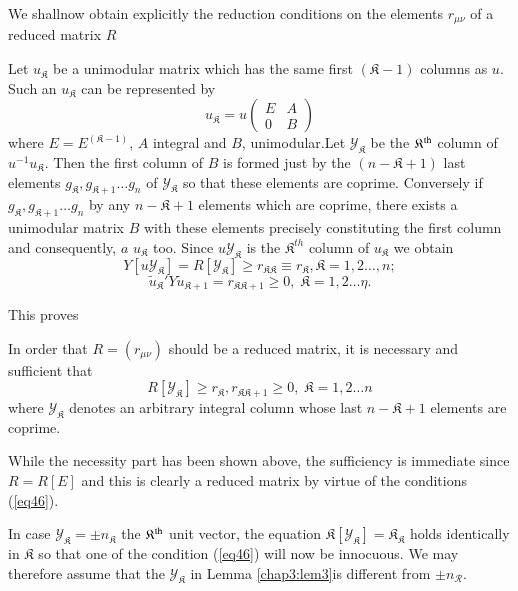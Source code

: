  We shall\pageoriginale now obtain explicitly the reduction conditions
 on the  elements $r_{\mu \nu}$ of a reduced matrix $R$  
 
 Let $u_{\mathfrak{K}}$ be a unimodular matrix which has the same first
 $(\mathfrak{K}-1)$ columns as $u$. Such an $u_{\mathfrak{K}}$ can be
 represented by   
 $$
  u_{\mathfrak{K}} = u \begin{pmatrix}  E & A \\ 0 & B\end{pmatrix} 
 $$ 
 where $E =E^{({\mathfrak{K}} - 1)}$, $A$ integral and $B$, unimodular.Let
 $\mathscr{Y}_{\mathfrak{K}}$ be the $\mathfrak{K}^{\rm th}$ column of
 $u^{-1} u _{\mathfrak{K}}$. Then the first column of $B$ is formed
 just by the  $(n - \mathfrak{K} +1)$ last elements $g_\mathfrak{K}
 ,g_{\mathfrak{K}+1} \ldots g_n $ of $\mathscr{Y}_{\mathfrak{K}}$ so
 that these elements are coprime. Conversely if $g_{\mathfrak{K}}
 ,g_{\mathfrak{K}+1} \ldots g_n $ by any $ n- {\mathfrak{K} +1}$
 elements which are coprime, there exists a unimodular matrix $B$ with
 these elements precisely constituting the first column and
 consequently, $a$  $u_{\mathfrak{K}}$ too. Since $u
 \mathscr{Y}_\mathfrak{K}$ is the ${\mathfrak{K}^{th}}$ column of
 $u_{\mathfrak{K}}$ we obtain 
 $$
 Y [u \mathscr{Y}_{\mathfrak{K}}] = R [\mathscr{Y}_{\mathfrak{K}}]
 \ge r_{\mathfrak{K} \mathfrak{K}} \equiv r_{\mathfrak{K}},
 \mathfrak{K} = 1,2\ldots ,n; 
 $$
 $$
 \tilde{u}_{\mathfrak{K}}' Y \tilde{u}_{\mathfrak{K}+1} =
 r_{\mathfrak{K}\mathfrak{K} +1} \ge 0,\; \mathfrak{K} = 1,2 \dots
 \eta . 
 $$
 
 This proves

\setcounter{lem}{2}
 \begin{lem} \label{chap3:lem3} %
In order that $R = (r_{\mu \nu})$ should be a reduced matrix, it
  is necessary and sufficient that  
\begin{equation*}
R [\mathscr{Y}_\mathfrak{K}] \ge r_\mathfrak{K}, r_{\mathfrak{K}
  \mathfrak{K}+1} \ge 0, \; \mathfrak{K} = 1,2 \dots n  \tag{46}\label{eq46} 
\end{equation*}
where $\mathscr{Y}_{\mathfrak{K}}$ denotes an arbitrary integral
  column whose last $n - \mathfrak{K}+1$ elements are coprime. 
 \end{lem} 
 
 While the necessity part has been shown above, the sufficiency is
 immediate since $R = R[E]$ and this is clearly a reduced matrix by
 virtue of the conditions (\ref{eq46}).  
 
 In case $\mathscr{Y}_{\mathfrak{K}} = \pm n_{\mathfrak{K}}$ the
 $\mathfrak{K}^{\rm th}$ unit vector, the equation $\mathfrak{K}
 [\mathscr{Y}_\mathfrak{K}] = \mathfrak{K}_\mathfrak{K}$ holds
 identically in $\mathfrak{K}$ so that one of the condition (\ref{eq46})
 will now be innocuous. We may therefore assume that the
 $\mathscr{Y}_\mathfrak{K}$ in  
Lemma \ref{chap3:lem3}\pageoriginale is different from $ \pm n_{\mathcal{R}}$.

